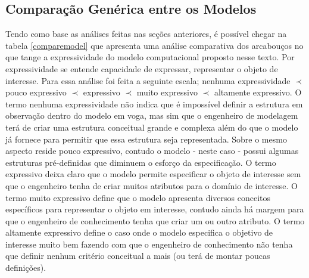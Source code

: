 \subsection{Comparação Genérica entre os Modelos}

Tendo como base as análises feitas nas seções anteriores, é possível chegar na tabela \ref{comparemodel} que apresenta uma análise comparativa dos arcabouços no que tange a expressividade do modelo computacional proposto nesse texto. Por expressividade se entende capacidade de expressar, representar o objeto de interesse. Para essa análise 
foi feita a seguinte escala; nenhuma expressividade $\prec$ pouco expressivo $\prec$ expressivo $\prec$ muito expressivo $\prec$ altamente expressivo. O termo nenhuma expressividade 
não indica que é impossível definir a estrutura em observação dentro do modelo em voga, mas sim que o engenheiro de modelagem terá de criar uma estrutura conceitual grande e complexa além do que o modelo já fornece para permitir que essa estrutura seja representada. Sobre o mesmo aspecto reside pouco expressivo, contudo o modelo - neste caso - possui algumas estruturas pré-definidas que diminuem o esforço da especificação. O termo expressivo deixa claro que o modelo permite especificar o objeto de interesse sem que o engenheiro tenha de criar muitos atributos para o domínio de interesse. O termo muito expressivo define que o modelo apresenta diversos conceitos específicos para representar o objeto em interesse, contudo ainda há margem para que o engenheiro de conhecimento tenha que criar um ou outro atributo. O termo altamente expressivo define o caso onde o modelo especifica o objetivo de interesse muito bem fazendo com que o engenheiro de conhecimento não tenha que definir nenhum critério conceitual a mais (ou terá de montar poucas definições).   

